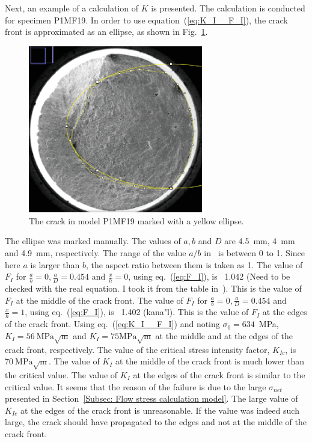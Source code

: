 \documentclass[preprint,12pt]{elsarticle}
\begin{document}
Next, an example of a calculation of $K$ is presented.
The calculation is conducted for specimen P1MF19.
In order to use equation~(\ref{eq:K_I__F_I}), the crack front is approximated as an ellipse, as shown in Fig.~\ref{fig:P1MF19_elip_crack}.
%
\begin{figure}[t!]
  \begin{center}
  \includegraphics[width=3in]{P1MF19_elip_crack.eps}
  \caption{The crack in model P1MF19 marked with a yellow ellipse.}
  \label{fig:P1MF19_elip_crack}
   \end{center}
\end{figure}
%
The ellipse was marked manually.
The values of $a, b$ and $D$ are 4.5~mm, 4~mm and 4.9~mm, respectively.
The range of the value $a/b$ in~\cite{shin2004experimental} is between 0 to 1.
Since here $a$ is larger than $b$, the aspect ratio between them is taken as 1.
The value of $F_I$ for $\frac{a}{b}=0, \frac{a}{D}=0.454$ and $\frac{x}{h}=0$, using eq.~(\ref{eq:F_I}), is ~1.042 (Need to be checked with the real equation. I took it from the table in~\cite{shin2004experimental}).
This is the value of $F_I$ at the middle of the crack front.
The value of $F_I$ for $\frac{a}{b}=0, \frac{a}{D}=0.454$ and $\frac{x}{h}=1$, using eq.~(\ref{eq:F_I}), is ~1.402 (kana"l).
This is the value of $F_I$ at the edges of the crack front.
Using eq.~(\ref{eq:K_I__F_I}) and noting $\sigma_0=634$~MPa, $K_I=56~\mbox{MPa}\sqrt{\mbox{m}}$ and $K_I=75\mbox{MPa}\sqrt{\mbox{m}}$ at the middle and at the edges of the crack front, respectively.
The value of the critical stress intensity factor, $K_{Ic}$, is $70~\mbox{MPa}\sqrt{\mbox{m}}$.
The value of $K_I$ at the middle of the crack front is much lower than the critical value.
The value of $K_I$ at the edges of the crack front is similar to the critical value.
It seems that the reason of the failure is due to the large $\sigma_{net}$ presented in Section~\ref{Subsec: Flow stress calculation model}.
The large value of $K_{Ic}$ at the edges of the crack front is unreasonable.
If the value was indeed such large, the crack should have propagated to the edges and not at the middle of the crack front.
\end{document}
